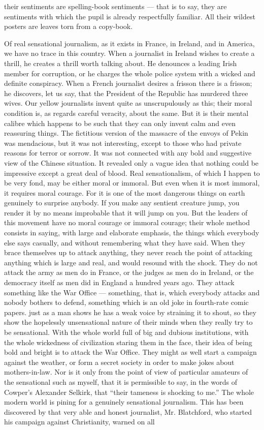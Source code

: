 their sentiments are spelling-book sentiments — that is to say, they are sentiments with which the pupil is already respectfully familiar. All their wildest posters are leaves torn from a copy-book.

Of real sensational journalism, as it exists in France, in Ireland, and in America, we have no trace in this country. When a journalist in Ireland wishes to create a thrill, he creates a thrill worth talking about. He denounces a leading Irish member for corruption, or he charges the whole police system with a wicked and definite conspiracy. When a French journalist desires a frisson there is a frisson; he discovers, let us say, that the President of the Republic has murdered three wives. Our yellow journalists invent quite as unscrupulously as this; their moral condition is, as regards careful veracity, about the same. But it is their mental calibre which happens to be such that they can only invent calm and even reassuring things. The fictitious version of the massacre of the envoys of Pekin was mendacious, but it was not interesting, except to those who had private reasons for terror or sorrow. It was not connected with any bold and suggestive view of the Chinese situation. It revealed only a vague idea that nothing could be impressive except a great deal of blood. Real sensationalism, of which I happen to be very fond, may be either moral or immoral. But even when it is most immoral, it requires moral courage. For it is one of the most dangerous things on earth genuinely to surprise anybody. If you make any sentient creature jump, you render it by no means improbable that it will jump on you. But the leaders of this movement have no moral courage or immoral courage; their whole method consists in saying, with large and elaborate emphasis, the things which everybody else says casually, and without remembering what they have said. When they brace themselves up to attack anything, they never reach the point of attacking anything which is large and real, and would resound with the shock. They do not attack the army as men do in France, or the judges as men do in Ireland, or the democracy itself as men did in England a hundred years ago. They attack something like the War Office — something, that is, which everybody attacks and nobody bothers to defend, something which is an old joke in fourth-rate comic papers. just as a man shows he has a weak voice by straining it to shout, so they show the hopelessly unsensational nature of their minds when they really try to be sensational. With the whole world full of big and dubious institutions, with the whole wickedness of civilization staring them in the face, their idea of being bold and bright is to attack the War Office. They might as well start a campaign against the weather, or form a secret society in order to make jokes about mothers-in-law. Nor is it only from the point of view of particular amateurs of the sensational such as myself, that it is permissible to say, in the words of Cowper’s Alexander Selkirk, that “their tameness is shocking to me.” The whole modern world is pining for a genuinely sensational journalism. This has been discovered by that very able and honest journalist, Mr. Blatchford, who started his campaign against Christianity, warned on all 